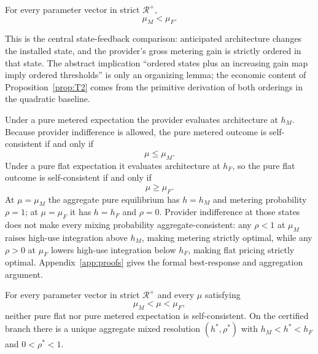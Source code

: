 \begin{proposition}\label{prop:T2}
For every parameter vector in strict $\mathcal R^+$,
\begin{equation}
 \mu_M<\mu_F.
 \label{eq:T2}
\end{equation}
\end{proposition}

This is the central state-feedback comparison: anticipated architecture changes the installed state, and the provider's gross metering gain is strictly ordered in that state. The abstract implication ``ordered states plus an increasing gain map imply ordered thresholds'' is only an organizing lemma; the economic content of Proposition~\ref{prop:T2} comes from the primitive derivation of both orderings in the quadratic baseline.

Under a pure metered expectation the provider evaluates architecture at $h_M$. Because provider indifference is allowed, the pure metered outcome is self-consistent if and only if
\begin{equation}
 \mu\leq\mu_M.
 \label{eq:metered-pure-condition}
\end{equation}
Under a pure flat expectation it evaluates architecture at $h_F$, so the pure flat outcome is self-consistent if and only if
\begin{equation}
 \mu\geq\mu_F.
 \label{eq:flat-pure-condition}
\end{equation}
At $\mu=\mu_M$ the aggregate pure equilibrium has $h=h_M$ and metering probability $\rho=1$; at $\mu=\mu_F$ it has $h=h_F$ and $\rho=0$. Provider indifference at those states does not make every mixing probability aggregate-consistent: any $\rho<1$ at $\mu_M$ raises high-use integration above $h_M$, making metering strictly optimal, while any $\rho>0$ at $\mu_F$ lowers high-use integration below $h_F$, making flat pricing strictly optimal. Appendix~\ref{app:proofs} gives the formal best-response and aggregation argument.

\begin{proposition}\label{prop:T3}
For every parameter vector in strict $\mathcal R^+$ and every $\mu$ satisfying
\begin{equation}
 \mu_M<\mu<\mu_F,
 \label{eq:strict-gap}
\end{equation}
neither pure flat nor pure metered expectation is self-consistent. On the certified branch there is a unique aggregate mixed resolution $(h^*,\rho^*)$ with $h_M<h^*<h_F$ and $0<\rho^*<1$.
\end{proposition}

